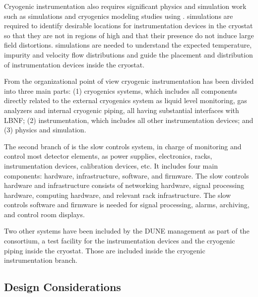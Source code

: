 Cryogenic instrumentation also requires significant physics and
simulation work such as \efield simulations and cryogenics modeling
studies using . \efield simulations
are required to identify desirable locations for instrumentation
devices in the cryostat so that they are not in regions of high \efield and
that their presence do not induce large field distortions. 
simulations are needed to understand the expected temperature,
impurity and velocity flow distributions and guide the placement and
distribution of instrumentation devices inside the cryostat.


From the organizational point of view
cryogenic instrumentation has been divided into three main parts: (1) cryogenics systems, which includes all components directly related to the external cryogenics system as
liquid level monitoring, gas analyzers and internal cryogenic piping, all having substantial interfaces with LBNF; (2) \lar  instrumentation, which includes all
other instrumentation devices; and (3) physics and simulation.


The second branch of  is the slow controls system, in charge of monitoring and control most detector elements, as power supplies, electronics, racks, instrumentation devices,
calibration devices, etc. It includes four main components: hardware, infrastructure,
software, and firmware. The slow controls hardware and infrastructure consists of
networking hardware, signal processing hardware, computing hardware, and relevant
rack infrastructure. The slow controls software and firmware is needed for
signal processing, alarms, archiving, and control room displays.

Two other systems have been included by the DUNE management as part of the  consortium,
a test facility for the instrumentation devices and the cryogenic piping inside the cryostat.
Those are included inside the cryogenic instrumentation branch.



\subsection{Design Considerations}
\label{sec:fddp-slow-cryo-des-consid}

